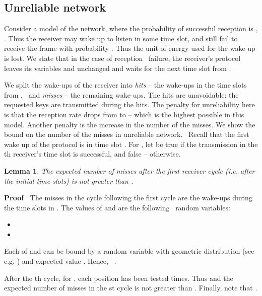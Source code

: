 \documentclass{article}
\newcommand{\tmem}[1]{{\em #1\/}}
\newenvironment{proof}{\noindent\textbf{Proof\ }}{\hspace*{\fill}\medskip}
\newtheorem{lemma}{Lemma}
\begin{document}
\subsection{\label{Section-unreliable}Unreliable network}

Consider a model of the network, where the probability of successful reception
is , . Thus the receiver may wake up to listen in some
time slot, and still fail to receive the frame with probability .
Thus the unit of energy used for the wake-up is lost. We state that in the
case of reception \ failure, the receiver's protocol leaves its variables
 and  unchanged and waits for the next time slot from
.

We split the wake-ups of the receiver into {\tmem{hits}} -- the wake-ups in
the time slots from , \ and {\tmem{misses}} -- the
remaining wake-ups. The hits are unavoidable: the requested keys are
transmitted during the hits. The penalty for unreliability here is that the
reception rate drops from  to  -- which is the highest possible in this
model. Another penalty is the increase in the number of the misses. We
show the bound on the number of the misses in unreliable network. \ Recall
that the first wake up of the protocol is in time slot . For ,
let  be true if the transmission in the th receiver's
time slot is successful, and false -- otherwise.

\begin{lemma}
  \label{Lemma-expected-trailer}The expected number of misses after the first
  receiver cycle (i.e. after the initial  time slots) is not greater than
  .
\end{lemma}

\begin{proof}
  The misses in the cycle following the first cycle are the wake-ups during
  the time slots in . The values of  and  are
  the following \ random variables:
  \begin{itemize}
    \item 
    
    \item 
  \end{itemize}
  Each of  and  can be bound
  by a random variable with geometric distribution (see e.g.
  {\cite{CormenLR89}}) and expected value . Hence, \ .
  
  After the th cycle, for , each position has been tested 
  times. Thus  and the expected number of misses in the
  st cycle is not greater than . Finally, note
  that .
\end{proof}
\end{document}
